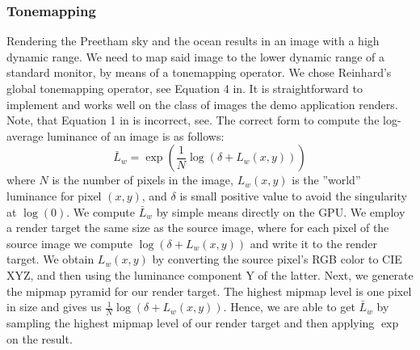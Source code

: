 \subsubsection{Tonemapping}
Rendering the Preetham sky and the ocean results in an image with a high dynamic range.
We need to map said image to the lower dynamic range of a standard monitor, by means
of a tonemapping operator. We chose Reinhard's global tonemapping operator, see
Equation 4 in\cite{Reinhard:2002}. It is straightforward to implement and
works well on the class of images the demo application renders. Note, that Equation 1
in\cite{Reinhard:2002} is incorrect, see\cite{Reinhard:2002:erratum}. The correct
form to compute the log-average luminance of an image is as follows:
\begin{equation*}
 \bar L_w = \exp\left(\frac{1}{N}\log(\delta + L_w(x,y))\right)
\end{equation*}
where $N$ is the number of pixels in the image, $L_w(x,y)$ is the ''world'' luminance for
pixel $(x,y)$, and $\delta$ is small positive value to avoid the singularity at
$\log(0)$. We compute $\bar L_w$ by simple means directly on the GPU. We employ a render
target the same size as the source image, where for each pixel of the source image
we compute $\log(\delta + L_w(x,y))$ and write it to the render target. We obtain
$L_w(x,y)$ by converting the source pixel's RGB color to CIE XYZ, and then using the
luminance component Y of the latter. Next, we generate the mipmap pyramid for
our render target. The highest mipmap level is one pixel in size and gives us
$\frac{1}{N}\log(\delta + L_w(x,y))$. Hence, we are able to get $\bar L_w$ by sampling
the highest mipmap level of our render target and then applying $\exp$ on the result.
